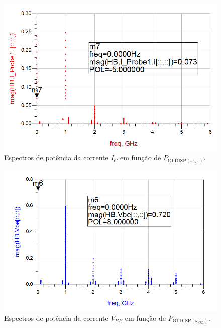 \documentclass[11pt]{article}
\numberwithin{equation}{section}
\begin{document}
\begin{figure}[h]
\centering
\includegraphics[keepaspectratio=true, scale=0.45]{exps/ID}
\vspace{-0.5em}
\caption{Espectros de potência da corrente $I_{C}$ em função de $ P_{\text{OLDISP}\left(\omega_{OL}\right)} $.}
\vspace{-0.8em}
\label{fig:ID}
\end{figure}

\pagebreak

\begin{figure}[h]
\centering
\includegraphics[keepaspectratio=true, scale=0.45]{exps/Vbe}
\vspace{-0.5em}
\caption{Espectros de potência da corrente $V_{BE}$ em função de $ P_{\text{OLDISP}\left(\omega_{OL}\right)} $.}
\vspace{-0.8em}
\label{fig:Vbe}
\end{figure}
\end{document}

